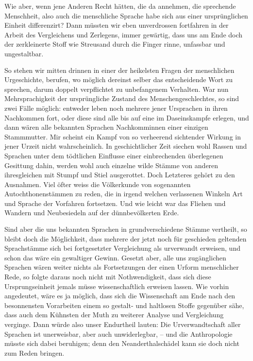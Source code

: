 Wie aber, wenn jene Anderen Recht hätten, die da annehmen, die sprechende Menschheit, also auch die menschliche Sprache habe sich aus einer ursprünglichen Einheit differenzirt? Dann müssten wir eben unverdrossen fortfahren in der Arbeit des Vergleichens und Zerlegens, \label{fp.152} immer gewärtig, dass uns am Ende doch der zerkleinerte Stoff wie Streusand durch die Finger rinne, unfassbar und ungestaltbar.

So stehen wir mitten drinnen in einer der heikelsten Fragen der menschlichen Urgeschichte, berufen, wo möglich dereinst selber das entscheidende Wort zu sprechen, darum doppelt verpflichtet zu unbefangenem Verhalten. War nun Mehrsprachigkeit der ursprüngliche Zustand des Menschengeschlechtes, so sind zwei Fälle möglich: entweder leben noch mehrere jener Ursprachen in ihren Nachkommen fort, oder diese sind alle bis auf eine im Daseinskampfe erlegen, und dann wären alle bekannten Sprachen Nachkomminnen einer einzigen Stammmutter. Mir scheint ein Kampf von so verheerend sichtender Wirkung in jener Urzeit nicht wahrscheinlich. In geschichtlicher Zeit siechen wohl Rassen und Sprachen unter dem tödtlichen Einflusse einer einbrechenden überlegenen Gesittung dahin, werden wohl auch einzelne wilde Stämme von anderen ihresgleichen mit Stumpf und Stiel ausgerottet. Doch Letzteres gehört zu den Ausnahmen. Viel öfter weiss die Völkerkunde von sogenannten Autochthonenstämmen zu reden, die in irgend welchen verlassenen Winkeln Art und Sprache \label{sp.144} der Vorfahren fortsetzen. Und wie leicht war das Fliehen und Wandern und Neubesiedeln auf der dünnbevölkerten Erde.

Sind aber die uns bekannten Sprachen in grundverschiedene Stämme vertheilt, so bleibt doch die Möglichkeit, dass mehrere der jetzt noch für geschieden geltenden Sprachstämme sich bei fortgesetzter Vergleichung als urverwandt erweisen, und schon das wäre ein gewaltiger Gewinn. Gesetzt aber, alle uns zugänglichen Sprachen wären weiter nichts als Fortsetzungen der einen Urform menschlicher Rede, so folgte daraus noch nicht mit Nothwendigkeit, dass sich diese Ursprungseinheit jemals müsse wissenschaftlich erweisen lassen. Wie vorhin angedeutet, wäre es ja möglich, dass sich die Wissenschaft am Ende nach den besonnensten Vorarbeiten einem so gestalt- und haltlosen Stoffe gegenüber sähe, dass auch dem Kühnsten der Muth zu weiterer Analyse und Vergleichung verginge. Dann würde also unser Endurtheil lauten: Die Urverwandtschaft aller Sprachen ist unerweisbar, aber auch unwiderlegbar, – und die Anthropologie müsste sich dabei beruhigen; denn den Neanderthalschädel kann sie doch nicht zum Reden bringen.

